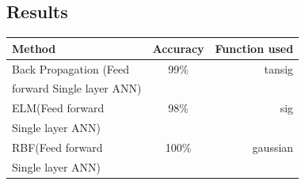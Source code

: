 \documentclass[conference]{IEEEtran}
\begin{document}
\subsection{Results}
\begin{center}
  \begin{tabular}{ | l | c  | r |}
    \hline
    Method & Accuracy  & Function used\\ \hline
    Back Propagation (Feed  & 99\% & tansig \\ 
    forward Single layer ANN)&   &         \\ \hline
    ELM(Feed forward&98\% & sig \\ 
     Single layer ANN)&& \\ \hline
    RBF(Feed forward&100\%& gaussian\\  
    Single layer ANN)&& \\
    \hline
  \end{tabular}




\end{center}
%
%

\end{document}
